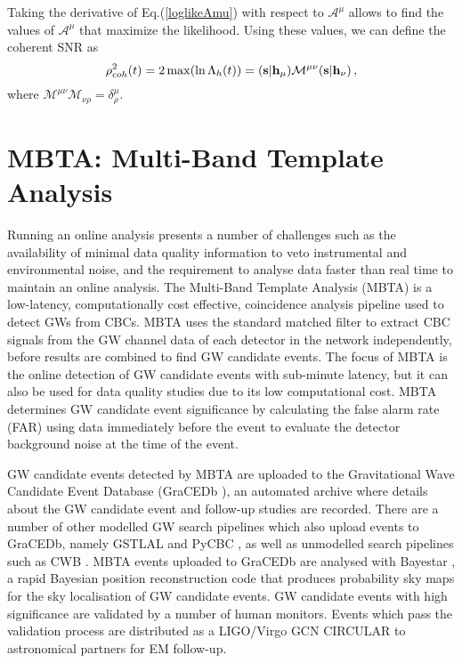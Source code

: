 \documentclass[aps, prd, twocolumn, superscriptaddress, nofootinbib]{revtex4-1}
\begin{document}
Taking the derivative of Eq.(\ref{loglikeAmu}) with respect to $\mathcal{A}^\mu$ allows to find the values of $\mathcal{A}^\mu$ that maximize the likelihood. Using these values, we can define the coherent SNR as
\begin{equation}\label{defcohSNR}
\rho_{coh}^2(t)=2\max(\ln\Lambda_h(t))=({\bf s}|{\bf h}_\mu)\mathcal{M}^{\mu\nu}({\bf s}|{\bf h}_\nu)\,,
\end{equation}
where $\mathcal{M}^{\mu\nu}\mathcal{M}_{\nu\rho}=\delta^\mu_\rho$.


\section{MBTA: Multi-Band Template Analysis}

Running an online analysis presents a number of challenges such as the availability of minimal data quality information to veto instrumental and environmental noise, and the requirement to analyse data faster than real time to maintain an online analysis. The Multi-Band Template Analysis (MBTA) \cite{Abadie2012,Adams2015} is a low-latency, computationally cost effective, coincidence analysis pipeline used to detect GWs from CBCs. MBTA uses the standard matched filter \cite{WaisZub1962} to extract CBC signals from the GW channel data of each detector in the network independently, before results are combined to find GW candidate events. The focus of MBTA is the online detection of GW candidate events with sub-minute latency, but it can also be used for data quality studies due to its low computational cost. MBTA determines GW candidate event significance by calculating the false alarm rate (FAR) using data immediately before the event to evaluate the detector background noise at the time of the event.

GW candidate events detected by MBTA are uploaded to the Gravitational Wave Candidate Event Database (GraCEDb \cite{gracedb}), an automated archive where details about the GW candidate event and follow-up studies are recorded. There are a number of other modelled GW search pipelines which also upload events to GraCEDb, namely GSTLAL \cite{Privitera2014} and PyCBC \cite{Usman2015}, as well as unmodelled search pipelines such as CWB \cite{Klimenko2008}. MBTA events uploaded to GraCEDb are analysed with Bayestar \cite{Singer2014}, a rapid Bayesian position reconstruction code that produces probability sky maps for the sky localisation of GW candidate events. GW candidate events with high significance are validated by a number of human monitors. Events which pass the validation process are distributed as a LIGO/Virgo GCN CIRCULAR \cite{gcn} to astronomical partners for EM follow-up. 
\end{document}
